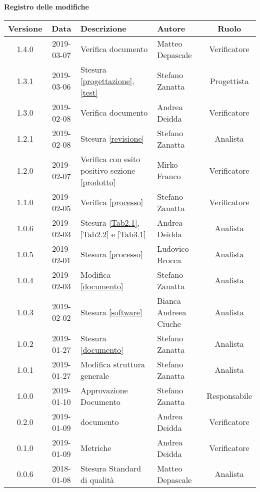 	\begin{center}
		\textbf{Registro delle modifiche}
	\end{center}
	\begin{center}
		\begin{tabularx}{\textwidth}{|c|c|X|X|c|}
			\hline
			\textbf{Versione} & \textbf{Data} & \textbf{Descrizione} & \textbf{Autore} & \textbf{Ruolo} \\
			\hline
			1.4.0 & 2019-03-07 &  Verifica documento & Matteo Depascale & Verificatore \\
			\hline
			1.3.1 & 2019-03-06 &  Stesura \ref{progettazione},\ref{test} & Stefano Zanatta & Progettista \\
			\hline
			1.3.0 & 2019-02-08 &  Verifica documento & Andrea Deidda & Verificatore \\
			\hline
			1.2.1 & 2019-02-08 &  Stesura \ref{revisione} & Stefano Zanatta & Analista \\
			\hline
			1.2.0 & 2019-02-07 & Verifica con esito positivo sezione \ref{prodotto} & Mirko Franco & Verificatore \\
			\hline
			1.1.0 & 2019-02-05 & Verifica \ref{processo}& Stefano Zanatta & Verificatore\\
			\hline
			1.0.6 & 2019-02-03 & Stesura \ref{Tab2.1}, \ref{Tab2.2} e \ref{Tab3.1} & Andrea Deidda & Analista\\
			\hline
			1.0.5 & 2019-02-01 & Stesura \ref{processo}& Ludovico Brocca & Analista\\
			\hline
			1.0.4 & 2019-02-03 & Modifica \ref{documento}& Stefano Zanatta & Analista\\
			\hline
			1.0.3 & 2019-02-02 & Stesura \ref{software}& Bianca Andreea Ciuche & Analista\\
			\hline
			1.0.2 & 2019-01-27 & Stesura \ref{documento}& Stefano Zanatta & Analista\\
			\hline
			1.0.1 & 2019-01-27 & Modifica struttura generale& Stefano Zanatta & Analista\\
			\hline
			1.0.0 & 2019-01-10 & Approvazione Documento& Stefano Zanatta & Responsabile\\
			\hline
			0.2.0 & 2019-01-09 & \glossario{Verifica} documento & Andrea Deidda & Verificatore\\
			\hline
			0.1.0 & 2019-01-09 & \glossario{Verifica} Metriche & Andrea Deidda & Verificatore\\
			\hline
			0.0.6 & 2018-01-08 & Stesura Standard di qualità & Matteo Depascale & Analista\\

\end{tabularx}
\end{center}
